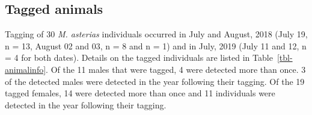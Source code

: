 \documentclass[
  authoryear,
  review,
  3p]{elsarticle}
\begin{document}
\hypertarget{tagged-animals}{%
\subsection{Tagged animals}\label{tagged-animals}}

Tagging of 30 \emph{M. asterias} individuals occurred in July and
August, 2018 (July 19, n = 13, August 02 and 03, n = 8 and n = 1) and in
July, 2019 (July 11 and 12, n = 4 for both dates). Details on the tagged
individuals are listed in Table~\ref{tbl-animalinfo}. Of the 11 males
that were tagged, 4 were detected more than once. 3 of the detected
males were detected in the year following their tagging. Of the 19
tagged females, 14 were detected more than once and 11 individuals were
detected in the year following their tagging.

\hypertarget{tbl-animalinfo}{}
\end{document}
